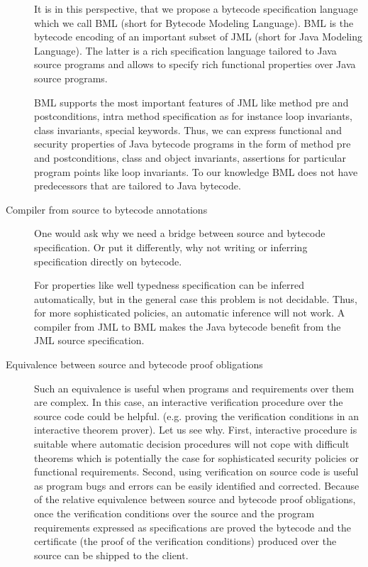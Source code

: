 \begin{description}
	 It is in this perspective, that we propose  a bytecode specification language which we call BML (short for Bytecode Modeling Language). 
	 BML is the bytecode encoding of an important subset of  JML (short for Java Modeling Language). The latter is a rich specification language tailored to Java source programs and
	 allows to specify rich functional properties over Java source programs.


 

	 BML supports the most important features of JML like method pre and postconditions, intra method specification as for instance loop invariants, class invariants, special
	 keywords. Thus, we can express functional and security properties of Java
	 bytecode programs in the form of method pre and postconditions, class and object invariants, assertions
	 for particular program points like loop invariants. To our knowledge BML does not have predecessors that are tailored 
	 to Java bytecode.  

   \item [Compiler from source to bytecode annotations]
         One would ask why we need a bridge between source and bytecode specification. Or put it differently, why not
	 writing or inferring specification directly on bytecode.
 
	 For properties like well typedness specification can be inferred automatically,
	 but in the general case this problem is not decidable.  
	 Thus, for more sophisticated policies, an automatic inference will not work.
	 A compiler from JML to BML  makes the Java  bytecode benefit from the JML source specification.

    \item[Equivalence between source and bytecode proof obligations] Such an equivalence is useful when programs and requirements over them are complex.
         In this case, an interactive verification procedure over the source code  could be helpful.
	 (e.g. proving the verification conditions in an interactive theorem prover).
	 Let us see why.
	 First, interactive  procedure is suitable where automatic decision procedures will not cope with
	 difficult theorems which is potentially the case for sophisticated security policies or functional requirements. 
	 Second, using verification on source code is useful as program bugs and errors can be easily identified and corrected.
	 Because of the relative equivalence between source and bytecode proof obligations, 
	 once the verification conditions over the source and the program requirements expressed as specifications are
	 proved the bytecode and the certificate (the proof of the verification conditions) produced over the source
	 can be shipped  to the client.
\end{description}

